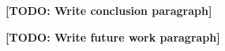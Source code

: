 \documentclass[conference]{IEEEtran}
\begin{document}
\textbf{[TODO: Write conclusion paragraph]}

\textbf{[TODO: Write future work paragraph]}


\end{document}
